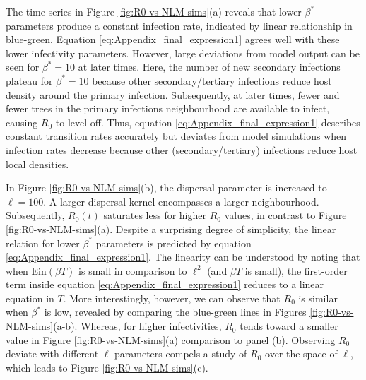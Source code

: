 The time-series in Figure \ref{fig:R0-vs-NLM-sims}(a) reveals that lower $\beta^*$ parameters produce a constant infection rate, indicated by linear relationship in blue-green.
Equation \ref{eq:Appendix_final_expression1} agrees well with these lower infectivity parameters. However, large deviations from model output can be seen for $\beta^*=10$ at later times. 
Here, the number of new secondary infections plateau for $\beta^*=10$ because other secondary/tertiary infections reduce host density around the primary infection. Subsequently, at later times, fewer and fewer trees in the primary infections neighbourhood are available to infect, causing $R_0$ to level off.
Thus, equation \ref{eq:Appendix_final_expression1} describes constant transition rates accurately but deviates from model simulations when infection rates decrease because other (secondary/tertiary) infections reduce host local densities.

In Figure \ref{fig:R0-vs-NLM-sims}(b), the dispersal parameter is increased to $\ell=100$.
A larger dispersal kernel encompasses a larger neighbourhood.
Subsequently, $R_0(t)$ saturates less for higher $R_0$ values, in contrast to Figure \ref{fig:R0-vs-NLM-sims}(a).
Despite a surprising degree of simplicity, the linear relation for lower $\beta^*$ parameters is predicted by equation \ref{eq:Appendix_final_expression1}.
The linearity can be understood by noting that when $\mathrm{Ein}(\beta T)$ is small in comparison to $\ell^2$ (and $\beta T$ is small), the first-order term inside equation \ref{eq:Appendix_final_expression1} reduces to a linear equation in $T$.
More interestingly, however, we can observe that $R_0$ is similar when $\beta^*$ is low, revealed by comparing the blue-green lines in Figures \ref{fig:R0-vs-NLM-sims}(a-b).
Whereas, for higher infectivities, $R_0$ tends toward a smaller value in Figure \ref{fig:R0-vs-NLM-sims}(a) comparison to panel (b).
Observing $R_0$ deviate with different $\ell$ parameters compels a study of $R_0$ over the space of $\ell$, which leads to Figure \ref{fig:R0-vs-NLM-sims}(c).

